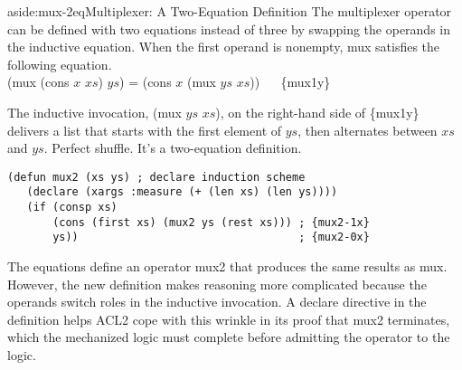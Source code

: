 \begin{aside}{aside:mux-2eq}{Multiplexer: A Two-Equation Definition}
The multiplexer operator can be defined with two equations instead of three
by swapping the operands in the inductive equation.
When the first operand is nonempty, \textsf{mux} satisfies the following equation.\\
\hspace*{1cm}\textsf{(mux (cons $x$ $xs$) $ys$) = (cons $x$ (mux $ys$ $xs$))} ~~ \{mux1y\}

The inductive invocation, \textsf{(mux $ys$ $xs$)},
on the right-hand side of \{mux1y\}
delivers a list that starts with the first element of $ys$,
then alternates between $xs$ and $ys$.
Perfect shuffle.
It's a two-equation definition. %

\label{mux-2eq-defun}
\begin{code}
\begin{verbatim}
(defun mux2 (xs ys) ; declare induction scheme
   (declare (xargs :measure (+ (len xs) (len ys))))
   (if (consp xs)
       (cons (first xs) (mux2 ys (rest xs))) ; {mux2-1x}
       ys))                                  ; {mux2-0x}
\end{verbatim}
\end{code}

The equations define an operator \textsf{mux2} that produces
the same results as \textsf{mux}.
However, the new definition makes reasoning more complicated
because the operands switch roles in the inductive invocation.
A \textsf{declare} directive in the definition
helps ACL2 cope with this wrinkle in its
proof that \textsf{mux2} terminates,
which the mechanized logic must complete before
admitting the operator to the logic.
\end{aside}

